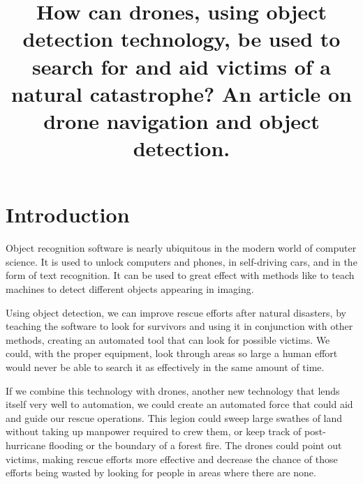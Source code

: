 \documentclass[fleqn,10pt]{wlscirep}
\title{How can drones, using object detection technology, be used to search for and aid victims of a natural catastrophe? An article on  drone navigation and object detection.}
\author{}
\begin{document}





\flushbottom
\maketitle

\section{Introduction}
Object recognition software is nearly ubiquitous in the modern world of computer science. It is used to unlock computers and phones, in self-driving cars, and in the form of text recognition. It can be used to great effect with methods like to teach machines to detect different objects appearing in imaging.

Using object detection, we can improve rescue efforts after natural disasters, by teaching the software to look for survivors and using it in conjunction with other methods, creating an automated tool that can look for possible victims. We could, with the proper equipment, look through areas so large a human effort would never be able to search it as effectively in the same amount of time.

If we combine this technology with drones, another new technology that lends itself very well to automation, we could create an automated force that could aid and guide our rescue operations. This legion could sweep large swathes of land without taking up manpower required to crew them, or keep track of post-hurricane flooding or the boundary of a forest fire. The drones could point out victims, making rescue efforts more effective and decrease the chance of those efforts being wasted by looking for people in areas where there are none. 
\end{document}
